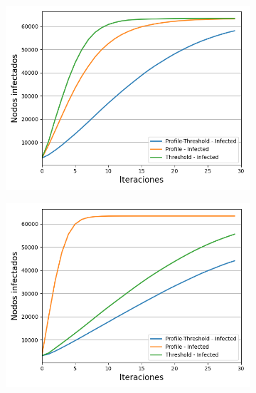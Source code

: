 \documentclass{article}
\begin{document}
\begin{figure}[!tbp]
\begin{subfigure}[b]{0.5\textwidth}
		\includegraphics[width=\textwidth]{../Images/Fig 3 c).png}
		\caption{}
		\label{fig:f33}
	\end{subfigure}
	\hfill
	\begin{subfigure}[b]{0.5\textwidth}
		\includegraphics[width=\textwidth]{../Images/Fig 3 d).png}
		\caption{}
		\label{fig:f34}
	\end{subfigure}
	\hfil
	\begin{subfigure}[b]{0.5\textwidth}

\end{subfigure}
\end{figure}
\end{document}
